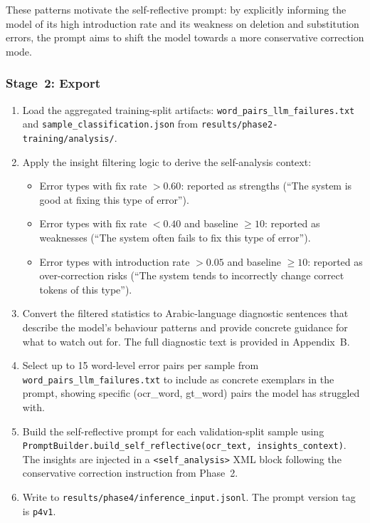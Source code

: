 These patterns motivate the self-reflective prompt: by explicitly informing
the model of its high introduction rate and its weakness on deletion and
substitution errors, the prompt aims to shift the model towards a more
conservative correction mode.

\subsubsection{Stage~2: Export}

\begin{enumerate}
  \item Load the aggregated training-split artifacts:
        \texttt{word\_pairs\_llm\_failures.txt} and
        \texttt{sample\_classification.json} from
        \texttt{results/phase2-training/analysis/}.

  \item Apply the insight filtering logic to derive the self-analysis context:
        \begin{itemize}
          \item Error types with fix rate $> 0.60$: reported as strengths
                (``The system is good at fixing this type of error'').
          \item Error types with fix rate $< 0.40$ and baseline $\geq 10$:
                reported as weaknesses (``The system often fails to fix
                this type of error'').
          \item Error types with introduction rate $> 0.05$ and baseline
                $\geq 10$: reported as over-correction risks (``The system
                tends to incorrectly change correct tokens of this type'').
        \end{itemize}

  \item Convert the filtered statistics to Arabic-language diagnostic sentences
        that describe the model's behaviour patterns and provide concrete
        guidance for what to watch out for. The full diagnostic text is
        provided in Appendix~B.

  \item Select up to 15 word-level error pairs per sample from
        \texttt{word\_pairs\_llm\_failures.txt} to include as concrete
        exemplars in the prompt, showing specific (ocr\_word, gt\_word)
        pairs the model has struggled with.

  \item Build the self-reflective prompt for each validation-split sample
        using
        \texttt{PromptBuilder.build\_self\_reflective(ocr\_text, insights\_context)}.
        The insights are injected in a \texttt{<self\_analysis>} XML block
        following the conservative correction instruction from Phase~2.

  \item Write to \texttt{results/phase4/inference\_input.jsonl}.
        The prompt version tag is \texttt{p4v1}.
\end{enumerate}

